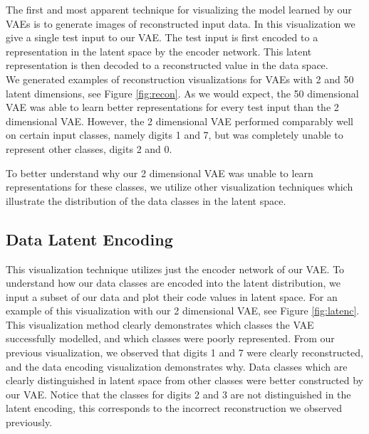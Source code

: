 \documentclass{article} %
\numberwithin{figure}{section}
\begin{document}
The first and most apparent technique for visualizing the model learned by our VAEs is to generate images of reconstructed input data. In this visualization we give a single test input to our VAE. The test input is first encoded to a representation in the latent space by the encoder network. This latent representation is then decoded to a reconstructed value in the data space. \\
We generated examples of reconstruction visualizations for VAEs with 2 and 50 latent dimensions, see Figure \ref{fig:recon}. As we would expect, the 50 dimensional VAE was able to learn better representations for every test input than the 2 dimensional VAE. However, the 2 dimensional VAE performed comparably well on certain input classes, namely digits 1 and 7, but was completely unable to represent other classes, digits 2 and 0. \\
\par To better understand why our 2 dimensional VAE was unable to learn representations for these classes, we utilize other visualization techniques which illustrate the distribution of the data classes in the latent space.

\subsection{Data Latent Encoding}
\begin{wrapfigure}{L}{0.5\textwidth}
  }
  \caption{Data Encoding Visualization} 
  \label{fig:latenc}
\end{wrapfigure}

This visualization technique utilizes just the encoder network of our VAE. To understand how our data classes are encoded into the latent distribution, we input a subset of our data and plot their code values in latent space. For an example of this visualization with our 2 dimensional VAE, see Figure \ref{fig:latenc}. This visualization method clearly demonstrates which classes the VAE successfully modelled, and which classes were poorly represented. From our previous visualization, we observed that digits 1 and 7 were clearly reconstructed, and the data encoding visualization demonstrates why. Data classes which are clearly distinguished in latent space from other classes were better constructed by our VAE. Notice that the classes for digits 2 and 3 are not distinguished in the latent encoding, this corresponds to the incorrect reconstruction we observed previously.\\
\end{document}
